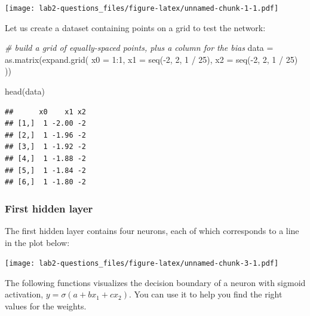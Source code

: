 \documentclass[
]{article}
\newenvironment{Shaded}{\begin{snugshade}}{\end{snugshade}}
\newcommand{\AttributeTok}[1]{\textcolor[rgb]{0.77,0.63,0.00}{#1}}
\newcommand{\CommentTok}[1]{\textcolor[rgb]{0.56,0.35,0.01}{\textit{#1}}}
\newcommand{\DecValTok}[1]{\textcolor[rgb]{0.00,0.00,0.81}{#1}}
\newcommand{\FunctionTok}[1]{\textcolor[rgb]{0.00,0.00,0.00}{#1}}
\newcommand{\NormalTok}[1]{#1}
\newcommand{\OtherTok}[1]{\textcolor[rgb]{0.56,0.35,0.01}{#1}}
\newcommand{\SpecialCharTok}[1]{\textcolor[rgb]{0.00,0.00,0.00}{#1}}
\begin{document}
\texttt{[image: lab2-questions\_files/figure-latex/unnamed-chunk-1-1.pdf]}

Let us create a dataset containing points on a grid to test the network:

\begin{Shaded}
\begin{Highlighting}[]
\CommentTok{\# build a grid of equally{-}spaced points, plus a column for the bias}
\NormalTok{data }\OtherTok{=} \FunctionTok{as.matrix}\NormalTok{(}\FunctionTok{expand.grid}\NormalTok{(}
  \AttributeTok{x0 =} \DecValTok{1}\SpecialCharTok{:}\DecValTok{1}\NormalTok{,}
  \AttributeTok{x1 =} \FunctionTok{seq}\NormalTok{(}\SpecialCharTok{{-}}\DecValTok{2}\NormalTok{, }\DecValTok{2}\NormalTok{, }\DecValTok{1} \SpecialCharTok{/} \DecValTok{25}\NormalTok{),}
  \AttributeTok{x2 =} \FunctionTok{seq}\NormalTok{(}\SpecialCharTok{{-}}\DecValTok{2}\NormalTok{, }\DecValTok{2}\NormalTok{, }\DecValTok{1} \SpecialCharTok{/} \DecValTok{25}\NormalTok{)}
\NormalTok{))}

\FunctionTok{head}\NormalTok{(data)}
\end{Highlighting}
\end{Shaded}

\begin{verbatim}
##      x0    x1 x2
## [1,]  1 -2.00 -2
## [2,]  1 -1.96 -2
## [3,]  1 -1.92 -2
## [4,]  1 -1.88 -2
## [5,]  1 -1.84 -2
## [6,]  1 -1.80 -2
\end{verbatim}

\hypertarget{first-hidden-layer}{%
\subsubsection{First hidden layer}\label{first-hidden-layer}}

The first hidden layer contains four neurons, each of which corresponds
to a line in the plot below:

\texttt{[image: lab2-questions\_files/figure-latex/unnamed-chunk-3-1.pdf]}

The following functions visualizes the decision boundary of a neuron
with sigmoid activation, \(y=\sigma(a+bx_1+cx_2)\). You can use it to
help you find the right values for the weights.
\end{document}
